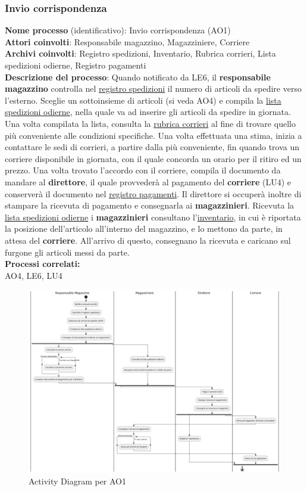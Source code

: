 \documentclass[a4paper,12pt]{article}
\begin{document}
\newpage
\subsubsection{Invio corrispondenza}
\textbf{Nome processo} (identificativo): Invio corrispondenza (AO1) \\
\textbf{Attori coinvolti}: Responsabile magazzino, Magazziniere, Corriere \\
\textbf{Archivi coinvolti}: Registro spedizioni, Inventario, Rubrica corrieri, Lista spedizioni odierne, Registro pagamenti \\
\textbf{Descrizione del processo}: Quando notificato da LE6, il \textbf{responsabile magazzino} controlla nel \underline{registro spedizioni} il numero di articoli
da spedire verso l'esterno. Sceglie un sottoinsieme di articoli (si veda AO4) e compila la \underline{lista spedizioni odierne}, 
nella quale va ad inserire gli articoli da spedire in giornata. Una volta compilata la lista, consulta la \underline{rubrica corrieri} al fine
di trovare quello più conveniente alle condizioni specifiche. Una volta effettuata una stima, inizia a contattare le sedi di corrieri, a partire dalla più 
conveniente, fin quando trova un corriere disponibile in giornata, con il quale concorda un orario per il ritiro ed un prezzo.
Una volta trovato l'accordo con il corriere, compila il documento da mandare al \textbf{direttore}, il quale provvederà al pagamento del \textbf{corriere} (LU4)
e conserverà il documento nel \underline{registro pagamenti}. Il direttore si occuperà inoltre di stampare la ricevuta di pagamento e 
consegnarla ai \textbf{magazzinieri}.
Ricevuta la \underline{lista spedizioni odierne} i \textbf{magazzinieri} consultano l'\underline{inventario}, in cui è riportata la posizione dell'articolo
all'interno del magazzino, e lo mettono da parte, in attesa del \textbf{corriere}. All'arrivo di questo, consegnano la ricevuta e caricano sul furgone gli articoli messi da parte. \\
\textbf{Processi correlati:}\\AO4, LE6, LU4\\
\begin{figure}[H]
  \centering
  \includegraphics[width=0.8\linewidth]{assets/activitydiagram_AO1.png}
  \caption{Activity Diagram per AO1}
\end{figure}
\end{document}
